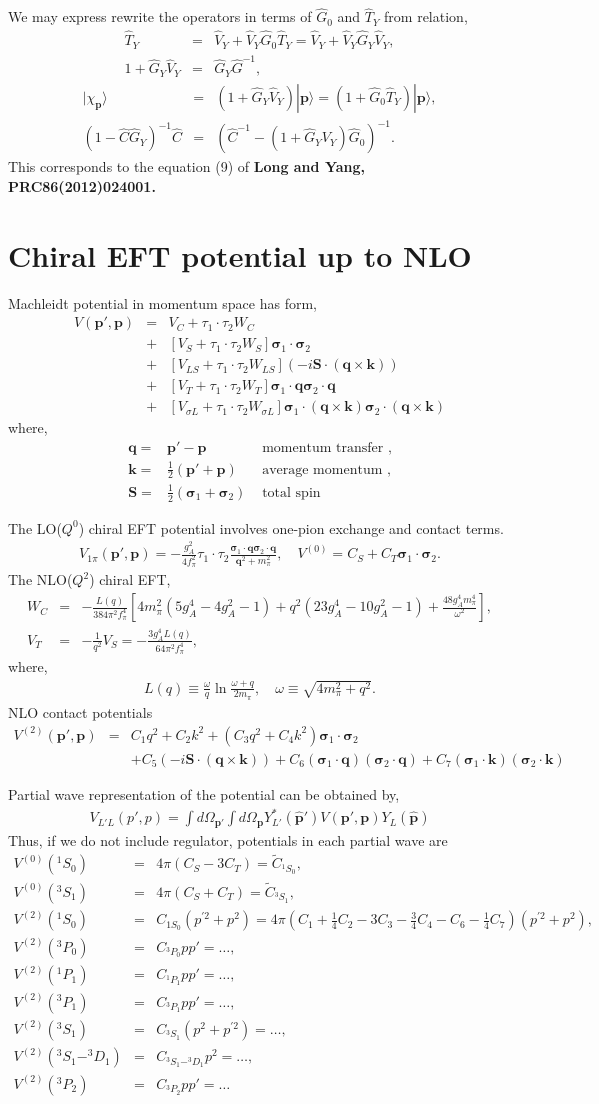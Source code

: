 \documentclass[10pt]{book}
\def\bm{\boldsymbol}
\newcommand{\bea}{\begin{eqnarray}}
\newcommand{\eea}{\end{eqnarray}}
\newcommand{\no}{\nonumber \\}
\def\vs{{\bm \sigma}}
\def\vp{{\bm p}}
\def\vq{{\bm q}}
\def\vk{{\bm k}}
\def\ra{\rangle}
\begin{document}
We may express rewrite the operators in terms of $\hat{G}_0$ and $\hat{T}_Y$ from relation,
\bea
\hat{T}_Y&=&\hat{V}_Y+\hat{V}_Y\hat{G}_0\hat{T}_Y
         =\hat{V}_Y+\hat{V}_Y\hat{G}_Y\hat{V}_Y, \no 
1+\hat{G}_Y\hat{V}_Y&=& \hat{G}_Y\hat{G}^{-1},
\eea
\bea
|\chi_\vp\ra&=&(1+\hat{G}_Y\hat{V}_Y)|\vp\ra
            =(1+\hat{G}_0\hat{T}_Y)|\vp\ra,\no
(1-\hat{C}\hat{G}_Y)^{-1}\hat{C}
&=&(\hat{C}^{-1}-(1+\hat{G}_YV_Y)\hat{G}_0)^{-1}.             
\eea
This corresponds to the equation (9) of {\bf 
Long and Yang, PRC86(2012)024001.}

\section{Chiral EFT potential up to NLO}
Machleidt potential in momentum space has form,
\bea 
V(\vp',\vp)&=&V_C+\tau_1\cdot\tau_2 W_C\no
           &+&\left[V_S+\tau_1\cdot\tau_2 W_S\right]\vs_1\cdot\vs_2\no 
           &+&\left[V_{LS}+\tau_1\cdot\tau_2 W_{LS}\right]
           (-i{\bm S}\cdot(\vq\times\vk))  \no 
           &+&\left[V_T+\tau_1\cdot\tau_2 W_T\right]
           \vs_1\cdot\vq \vs_2\cdot\vq \no 
           &+& \left[V_{\sigma L}+\tau_1\cdot\tau_2 W_{\sigma L}\right]
           \vs_1\cdot(\vq\times\vk )\vs_2\cdot(\vq\times\vk ) 
\eea  
where,
\bea 
\vq=&\vp'-\vp                    & \mbox{ momentum transfer } ,\no 
\vk=&\frac{1}{2}(\vp'+\vp)       & \mbox{ average momentum } ,\no
{\bm S}=&\frac{1}{2}(\vs_1+\vs_2) & \mbox{ total spin } 
\eea 

The LO($Q^0$) chiral EFT potential involves one-pion exchange and 
contact terms. 
\bea
V_{1\pi}(\vp',\vp)=-\frac{g_A^2}{4f_\pi^2}
 \tau_1\cdot\tau_2
 \frac{\vs_1\cdot\vq \vs_2\cdot\vq}{\vq^2+m_\pi^2},
 \quad V^{(0)}=C_S+C_T\vs_1\cdot \vs_2.  
\eea
The NLO($Q^2$) chiral EFT,
\bea 
W_C&=&-\frac{L(q)}{384\pi^2 f_\pi^4}
     \left[ 4m_\pi^2(5 g_A^4-4 g_A^2-1)
            +q^2(23 g_A^4-10 g_A^2-1)
            +\frac{48 g_A^4 m_\pi^4}{\omega^2} 
     \right],\no 
V_T&=& -\frac{1}{q^2} V_S=-\frac{3 g_A^4 L(q)}{64\pi^2 f_\pi^4},   
\eea 
where,
\bea 
L(q)\equiv \frac{\omega}{q}\ln \frac{\omega+q}{2m_\pi},
\quad \omega\equiv \sqrt{4 m_\pi^2+q^2}.
\eea 
NLO contact potentials
\bea 
V^{(2)}(\vp',\vp )
&=& C_1q^2+ C_2 k^2
+(C_3 q^2+ C_4 k^2)\vs_1\cdot\vs_2 \no & & 
+C_5(-i{\bm S}\cdot (\vq\times\vk ))
+C_6(\vs_1\cdot\vq )
    (\vs_2\cdot\vq )
+C_7(\vs_1\cdot\vk )(\vs_2\cdot\vk )      
\eea 

Partial wave representation of the potential can be obtained by,
\bea 
V_{L'L}(p',p)=\int d\Omega_{\vp'}\int d\Omega_{\vp}
             Y^*_{L'}(\hat{\vp}') V(\vp',\vp)
             Y_{L}(\hat{\vp})
\eea 
Thus, if we do not include regulator, potentials in each partial wave
are 
\bea 
V^{(0)}(^1S_0)&=& 4\pi (C_S-3C_T)=\widetilde{C}_{^1S_0},\no 
V^{(0)}(^3S_1)&=& 4\pi (C_S+C_T)=\widetilde{C}_{^3S_1},\no 
V^{(2)}(^1S_0)&=& C_{1S_0} (p^{'2}+p^2)
               =4\pi (C_1+\frac{1}{4}C_2-3C_3-\frac{3}{4}C_4
                -C_6-\frac{1}{4}C_7 )(p^{'2}+p^2),\no 
V^{(2)}(^3P_0)&=& C_{^3P_0} p p'=\dots,\no 
V^{(2)}(^1P_1)&=& C_{^1P_1}pp'=\dots,\no
V^{(2)}(^3P_1)&=& C_{^3P_1}pp'=\dots,\no
V^{(2)}(^3S_1)&=& C_{^3S_1}(p^2+p^{'2})=\dots,\no
V^{(2)}(^3S_1-^3D_1)
&=& C_{^3S_1-^3D_1} p^2=\dots,\no 
V^{(2)}(^3P_2)&=& C_{^3P_2}p p'=\dots                  
\eea 
\end{document}
